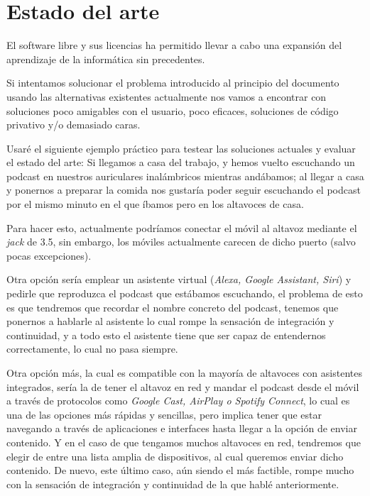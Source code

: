 \chapter{Estado del arte}

El software libre y sus licencias \cite{gplv3} ha permitido llevar a cabo una expansión del
aprendizaje de la informática sin precedentes.

Si intentamos solucionar el problema introducido al principio del documento
usando las alternativas existentes actualmente nos vamos a encontrar con
soluciones poco amigables con el usuario, poco eficaces, soluciones de código
privativo y/o demasiado caras.

Usaré el siguiente ejemplo práctico para testear las soluciones actuales y
evaluar el estado del arte: Si llegamos a casa del trabajo, y hemos vuelto
escuchando un podcast en nuestros auriculares inalámbricos mientras andábamos;
al llegar a casa y ponernos a preparar la comida nos gustaría poder seguir
escuchando el podcast por el mismo minuto en el que íbamos pero en los altavoces
de casa. 

Para hacer esto, actualmente podríamos conectar el móvil al altavoz mediante el
\emph{jack} de 3.5, sin embargo, los móviles actualmente carecen de dicho puerto
(salvo pocas excepciones). 

Otra opción sería emplear un asistente virtual (\emph{Alexa, Google Assistant,
Siri}) y pedirle que reproduzca el podcast que estábamos escuchando, el problema
de esto es que tendremos que recordar el nombre concreto del podcast, tenemos
que ponernos a hablarle al asistente lo cual rompe la sensación de integración y
continuidad, y a todo esto el asistente tiene que ser capaz de entendernos
correctamente, lo cual no pasa siempre. 

Otra opción más, la cual es compatible con la mayoría de altavoces con
asistentes integrados, sería la de tener el altavoz en red y mandar el podcast
desde el móvil a través de protocolos como \emph{Google Cast, AirPlay o Spotify
Connect}, lo cual es una de las opciones más rápidas y sencillas, pero implica
tener que estar navegando a través de aplicaciones e interfaces hasta llegar a
la opción de enviar contenido. Y en el caso de que tengamos muchos altavoces en
red, tendremos que elegir de entre una lista amplia de dispositivos, al cual
queremos enviar dicho contenido. De nuevo, este último caso, aún siendo el más
factible, rompe mucho con la sensación de integración y continuidad de la que
hablé anteriormente. 


